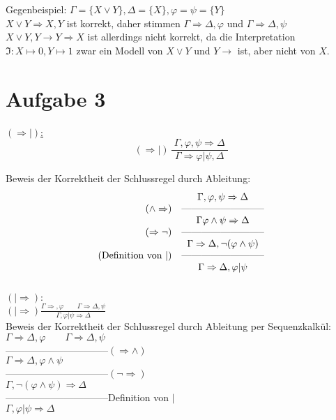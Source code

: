 \documentclass[11pt, a4paper]{article}
\renewcommand{\v}{\vee}
\newcommand{\n}{\wedge}
\begin{document}
Gegenbeispiel: $\Gamma = \{X \v Y \}, \Delta = \{X\}, \varphi = \psi = \{Y\}$\\
$X \v Y \Rightarrow X, Y$ ist korrekt, daher stimmen $\Gamma \Rightarrow \Delta, \varphi$ und $\Gamma \Rightarrow \Delta, \psi$\\
$X \v Y, Y \rightarrow Y \Rightarrow X$ ist allerdings nicht korrekt, da die Interpretation $\mathfrak{I}: X \mapsto 0, Y \mapsto 1$ zwar ein Modell von $X \v Y$ und $Y \rightarrow$ ist, aber nicht von $X$.


\section*{Aufgabe 3}

\underline{$(\Rightarrow |)$:}\\
\[ (\Rightarrow |) \, \frac{ \; \Gamma, \varphi, \psi \Rightarrow \Delta \; }{\Gamma \Rightarrow \varphi | \psi, \Delta}\]

Beweis der Korrektheit der Schlussregel durch Ableitung:
\renewcommand{\arraystretch}{.5}
\[\begin{array}{r c}
        & \Gamma, \varphi, \psi \Rightarrow \Delta \\
        (\n \Rightarrow) & \text{--------------------------} \\
        & \Gamma \varphi \n \psi \Rightarrow \Delta \\
        (\Rightarrow \neg) & \text{--------------------------} \\
        & \Gamma \Rightarrow \Delta, \neg (\varphi \n \psi) \\
        (\text{Definition von }|) & \text{--------------------------} \\
        & \Gamma \Rightarrow \Delta, \varphi | \psi
\end{array}\]
\\


$(| \Rightarrow ):$\\

$(| \Rightarrow) \frac{\Gamma \Rightarrow, \varphi \qquad \Gamma \Rightarrow \Delta, \psi}{\Gamma, \varphi | \psi  \Rightarrow \Delta}$\\

Beweis der Korrektheit der Schlussregel durch Ableitung per Sequenzkalkül:\\
$\Gamma \Rightarrow \Delta, \varphi \qquad \Gamma \Rightarrow \Delta, \psi$\\
--------------------------------$(\Rightarrow \n)$\\
$\Gamma \Rightarrow \Delta, \varphi \n \psi$\\
--------------------------------$(\neg \Rightarrow)$\\
$\Gamma, \neg (\varphi \n \psi) \Rightarrow \Delta$\\
--------------------------------Definition von $|$\\
$\Gamma, \varphi | \psi \Rightarrow \Delta$
\end{document}

